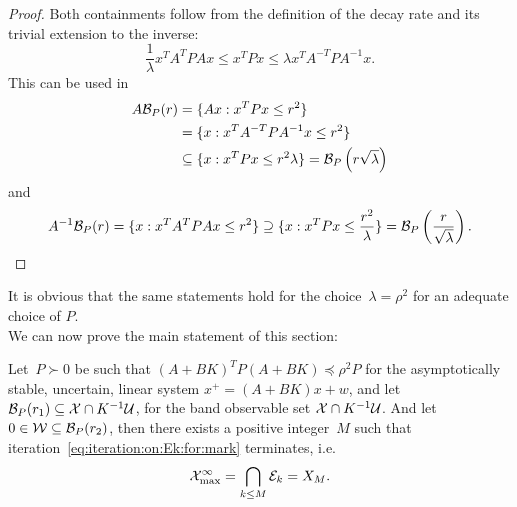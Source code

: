%
\begin{proof}
Both containments follow from the definition of the decay rate and its trivial extension to the inverse:
%
\begin{equation}
	\frac{1}{\lambda}x^TA^TPAx\leq x^TPx\leq\lambda x^TA^{-T}PA^{-1}x.
\end{equation}
%
This can be used in
%
\begin{equation}
	\begin{aligned}
	A\mathcal B_P(r) &= \{Ax:x^TPx\leq r^2\}\\
	&=\{x:x^TA^{-T}PA^{-1}x\leq r^2\}\\
	&\subseteq\{x:x^TPx\leq{r^2}{\lambda}\} = \mathcal B_P\left({r}{\sqrt\lambda}\right)
	\end{aligned}
\end{equation}
%
and
%
\begin{equation}
	A^{-1}\mathcal B_P(r) = \{x:x^TA^TPAx\leq r^2\}\supseteq\{x:x^TPx\leq\frac{r^2}{\lambda}\} = \mathcal B_P\left(\frac{r}{\sqrt\lambda}\right).
\end{equation}
\end{proof}
%
\noindent It is obvious that the same statements hold for the choice~$\lambda=\rho^2$ for an adequate choice of $P$.
%
\\[1em]
%
\mysplit We can now prove the main statement of this section:
%
\begin{thm}\label{thm:mrpi:main:theorem}
Let~$P\succ0$ be such that $(A+BK)^TP(A+BK)\preceq\rho^2 P$ for the asymptotically stable, uncertain, linear system $x^+=(A+BK)x+w$, and let $\mathcal B_P(r_1)\subseteq\mathcal X\cap K^{-1}\mathcal U$, for the band observable set $\mathcal X\cap K^{-1}\mathcal U$. And let $0\in\mathcal W\subseteq\mathcal B_P(r_2)$, then there exists a positive integer~$M$ such that iteration~\eqref{eq:iteration:on:Ek:for:mark} terminates, i.e.
%
\begin{equation}
	\mathcal X^\infty_{\max} = \bigcap_{k\leq M}\mathcal E_k = X_M.
\end{equation}
\end{thm}
%
